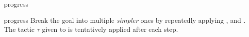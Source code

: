 \begin{tactic}{progress}
  \begin{tsyntax}[empty]{progress}
  Break the goal into multiple \emph{simpler} ones by repeatedly applying
  ,  and . The tactic $\tau$ given to
   is tentatively applied after each step.
  \end{tsyntax}
\end{tactic}

